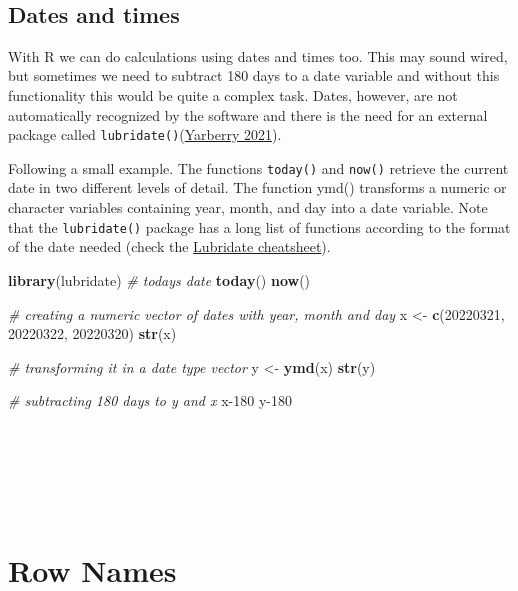 \documentclass[
]{svmono}
\newenvironment{Shaded}{\begin{snugshade}}{\end{snugshade}}
\newcommand{\CommentTok}[1]{\textcolor[rgb]{0.56,0.35,0.01}{\textit{#1}}}
\newcommand{\DecValTok}[1]{\textcolor[rgb]{0.00,0.00,0.81}{#1}}
\newcommand{\FunctionTok}[1]{\textcolor[rgb]{0.13,0.29,0.53}{\textbf{#1}}}
\newcommand{\NormalTok}[1]{#1}
\newcommand{\OtherTok}[1]{\textcolor[rgb]{0.56,0.35,0.01}{#1}}
\begin{document}
~

\hypertarget{dates-and-times}{%
\subsection{Dates and times}\label{dates-and-times}}

With R we can do calculations using dates and times too. This may sound
wired, but sometimes we need to subtract 180 days to a date variable and
without this functionality this would be quite a complex task. Dates,
however, are not automatically recognized by the software and there is
the need for an external package called \texttt{lubridate()}(\protect\hyperlink{ref-yarberry2021}{Yarberry 2021}).

Following a small example. The functions \texttt{today()} and \texttt{now()} retrieve
the current date in two different levels of detail. The function ymd()
transforms a numeric or character variables containing year, month, and
day into a date variable. Note that the \texttt{lubridate()} package has a long
list of functions according to the format of the date needed (check the
\href{https://rawgit.com/rstudio/cheatsheets/main/lubridate.pdf}{Lubridate cheatsheet}).

\begin{Shaded}
\begin{Highlighting}[]
\FunctionTok{library}\NormalTok{(lubridate)}
\CommentTok{\# today\textquotesingle{}s date}
\FunctionTok{today}\NormalTok{()}
\FunctionTok{now}\NormalTok{()}

\CommentTok{\# creating a numeric vector of dates with year, month and day}
\NormalTok{x }\OtherTok{\textless{}{-}} \FunctionTok{c}\NormalTok{(}\DecValTok{20220321}\NormalTok{, }\DecValTok{20220322}\NormalTok{, }\DecValTok{20220320}\NormalTok{)}
\FunctionTok{str}\NormalTok{(x)}

\CommentTok{\# transforming it in a date type vector }
\NormalTok{y }\OtherTok{\textless{}{-}} \FunctionTok{ymd}\NormalTok{(x)}
\FunctionTok{str}\NormalTok{(y)}

\CommentTok{\# subtracting 180 days to y and x}
\NormalTok{x}\DecValTok{{-}180}
\NormalTok{y}\DecValTok{{-}180}
\end{Highlighting}
\end{Shaded}

~

~

~

\hypertarget{row-names}{%
\section{Row Names}\label{row-names}}
\end{document}
